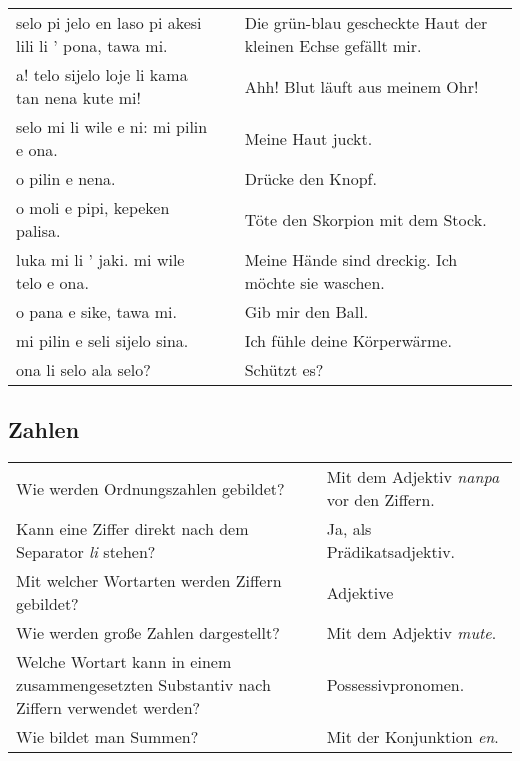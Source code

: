 \begin{supertabular}{p{5,5cm}|ll}
selo pi jelo en laso pi akesi lili li ' pona, tawa mi. && Die grün-blau gescheckte Haut der kleinen Echse gefällt mir. \\ %
a! telo sijelo loje li kama tan nena kute mi!  && Ahh! Blut läuft aus meinem Ohr! \\
selo mi li wile e ni: mi pilin e ona.  && Meine Haut juckt. \\
o pilin e nena.  && Drücke den Knopf. \\
o moli e pipi, kepeken palisa.  && Töte den Skorpion mit dem Stock. \\
luka mi li ' jaki. mi wile telo e ona.  && Meine Hände sind dreckig. Ich möchte sie waschen. \\
o pana e sike, tawa mi.  && Gib mir den Ball. \\
mi pilin e seli sijelo sina.  && Ich fühle deine Körperwärme. \\
ona li selo ala selo? && Schützt es? \\
\end{supertabular} 

\newpage
%
\subsection*{Zahlen} 
\label{'numbers'}

\begin{supertabular}{p{5,5cm}|ll}
Wie werden Ordnungszahlen gebildet? && Mit dem Adjektiv \textit{nanpa} vor den Ziffern.  \\ %
Kann eine Ziffer direkt nach dem Separator \textit{li} stehen? && Ja, als Prädikatsadjektiv.  \\ %
Mit welcher Wortarten werden Ziffern gebildet? && Adjektive \\ %
Wie werden große Zahlen dargestellt? && Mit dem Adjektiv \textit{mute}. \\ %
Welche Wortart kann in einem zusammengesetzten Substantiv nach Ziffern verwendet werden? && Possessivpronomen. \\ %
Wie bildet man Summen? && Mit der Konjunktion \textit{en}. \\ %
\end{supertabular}

